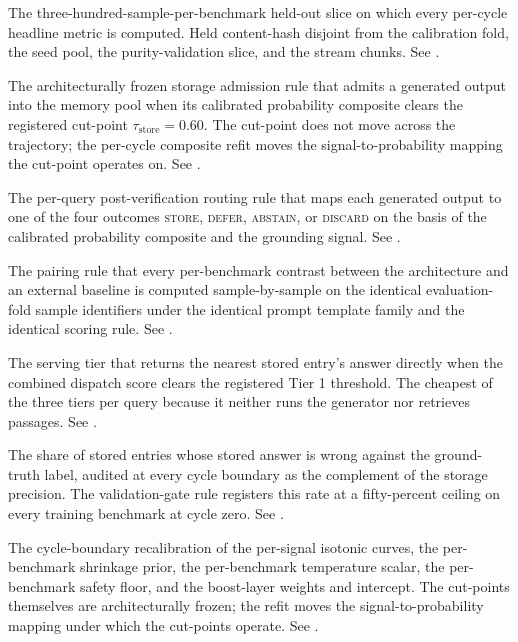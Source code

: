 \begin{description}[style=nextline, leftmargin=0pt, labelindent=0pt, itemsep=6pt, parsep=0pt, font=\bfseries, beginpenalty=10000]
\item[Evaluation fold.] The three-hundred-sample-per-benchmark held-out slice on which every per-cycle headline metric is computed. Held content-hash disjoint from the calibration fold, the seed pool, the purity-validation slice, and the stream chunks. See .

\item[Fixed-threshold storage gate.] The architecturally frozen storage admission rule that admits a generated output into the memory pool when its calibrated probability composite clears the registered cut-point $\tau_{\text{store}} = 0.60$. The cut-point does not move across the trajectory; the per-cycle composite refit moves the signal-to-probability mapping the cut-point operates on. See .

\item[Four-outcome decision tree.] The per-query post-verification routing rule that maps each generated output to one of the four outcomes \textsc{store}, \textsc{defer}, \textsc{abstain}, or \textsc{discard} on the basis of the calibrated probability composite and the grounding signal. See .

\item[Matched-protocol contract.] The pairing rule that every per-benchmark contrast between the architecture and an external baseline is computed sample-by-sample on the identical evaluation-fold sample identifiers under the identical prompt template family and the identical scoring rule. See .

\item[Memory-direct tier (Tier 1).] The serving tier that returns the nearest stored entry's answer directly when the combined dispatch score clears the registered Tier 1 threshold. The cheapest of the three tiers per query because it neither runs the generator nor retrieves passages. See .

\item[Memory-poisoning rate.] The share of stored entries whose stored answer is wrong against the ground-truth label, audited at every cycle boundary as the complement of the storage precision. The validation-gate rule registers this rate at a fifty-percent ceiling on every training benchmark at cycle zero. See .

\item[Per-cycle composite refit.] The cycle-boundary recalibration of the per-signal isotonic curves, the per-benchmark shrinkage prior, the per-benchmark temperature scalar, the per-benchmark safety floor, and the boost-layer weights and intercept. The cut-points themselves are architecturally frozen; the refit moves the signal-to-probability mapping under which the cut-points operate. See .


\end{description}
